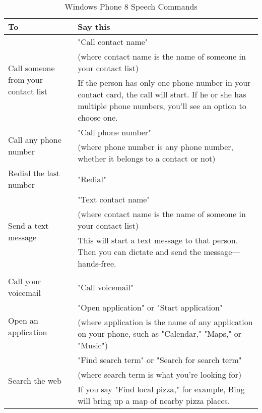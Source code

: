 \begin{table}[htbp]
  \centering
  \caption{Windows Phone 8 Speech Commands}
    \begin{tabular}{ll}
    \toprule
    To    & Say this \\
    \midrule
    \multirow{3}[2]{*}{Call someone from your contact list} & "Call contact name" \\ 
          & (where contact name is the name of someone in your contact list) \\
          & If the person has only one phone number in your contact card, the call will start. If he or she has multiple phone numbers, you'll see an option to choose one. \\
    \multirow{2}[2]{*}{Call any phone number} & "Call phone number" \\
          & (where phone number is any phone number, whether it belongs to a contact or not) \\
    Redial the last number & "Redial" \\
    \multirow{3}[2]{*}{Send a text message} & "Text contact name" \\
          & (where contact name is the name of someone in your contact list) \\
          & This will start a text message to that person. Then you can dictate and send the message—hands-free. \\
          &  \\
    Call your voicemail & "Call voicemail" \\
    \multirow{2}[2]{*}{Open an application} & "Open application" or "Start application" \\
          & (where application is the name of any application on your phone, such as "Calendar," "Maps," or "Music") \\
    \multirow{3}[2]{*}{Search the web} & "Find search term" or "Search for search term" \\
          & (where search term is what you're looking for) \\
          & If you say "Find local pizza," for example, Bing will bring up a map of nearby pizza places. \\
    \bottomrule
    \end{tabular}%
  \label{tab:addlabel}%
\end{table}%
